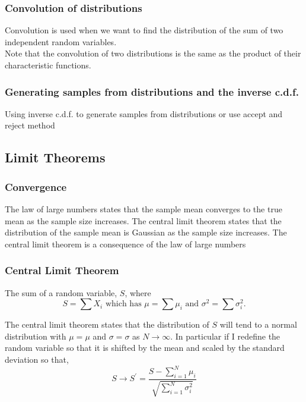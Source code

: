 \documentclass[12pt,a4paper]{article}
\begin{document}
\subsubsection{Convolution of distributions}
Convolution is used when we want to find the distribution of the sum of two independent random variables.\\
Note that the convolution of two distributions is the same as the product of their characteristic functions.\\
\subsubsection{Generating samples from distributions and the inverse c.d.f.}
Using inverse c.d.f. to generate samples from distributions
or use accept and reject method
\subsection{Limit Theorems}
\subsubsection{Convergence}
The law of large numbers states that the sample mean converges to the true mean as the sample size increases. The central limit theorem states that the distribution of the sample mean is Gaussian as the sample size increases. The central limit theorem is a consequence of the law of large numbers
\subsubsection{Central Limit Theorem}
The sum of a random variable, $S$, where
\begin{equation*}
S=\sum X_i \text { which has } \mu=\sum \mu_i \text { and } \sigma^2=\sum \sigma_i^2 .
\end{equation*}

The central limit theorem states that the distribution of $S$ will tend to a normal distribution with $\mu=\mu$ and $\sigma=\sigma$ as $N \rightarrow \infty$. In particular if I redefine the random variable so that it is shifted by the mean and scaled by the standard deviation so that,
\begin{equation*}
S \rightarrow S^{\prime}=\frac{S-\sum_{i=1}^N \mu_i}{\sqrt{\sum_{i=1}^N \sigma_i^2}}
\end{equation*}
\end{document}
